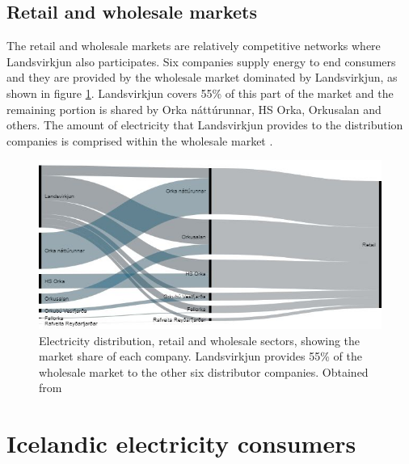 \documentclass[svn, final]{rureport}
\begin{document}
\subsection{Retail and wholesale markets}

The retail and wholesale markets are relatively competitive networks where Landsvirkjun also participates. Six companies supply energy to end consumers and they are provided by the wholesale market dominated by Landsvirkjun, as shown in figure \ref{fig:wholesale_retail}. Landsvirkjun covers 55\% of this part of the market and the remaining portion is shared by Orka náttúrunnar, HS Orka, Orkusalan and others. The amount of electricity that Landsvirkjun provides to the distribution companies is comprised within the wholesale market \cite{our_energy_2016}.

\begin{figure}[h!]
    \centering
    \includegraphics[width=\linewidth]{wholesale_retail.jpg}
    \caption{Electricity distribution, retail and wholesale sectors, showing the market share of each company. Landsvirkjun provides 55\% of the wholesale market to the other six distributor companies. Obtained from \cite{our_energy_2016}}
    \label{fig:wholesale_retail}
\end{figure}


\section{Icelandic electricity consumers}
\end{document}

